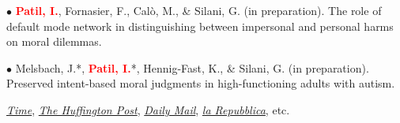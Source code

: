\documentclass[10pt]{article}
\begin{document}
	$\bullet$ \textbf{\textcolor{red}{Patil, I.}}, Fornasier, F., Cal\`{o}, M., \& Silani, G. (in preparation). The role of default mode network in \hspace*{0.1in}distinguishing between impersonal and personal harms on moral dilemmas.
	\miniskip
	
	$\bullet$ Melsbach, J.*, \textbf{\textcolor{red}{Patil, I.}}*, Hennig-Fast, K., \& Silani, G. (in preparation). Preserved intent-based moral \hspace*{0.1in}judgments in high-functioning adults with autism.
	
%	
%	
%	
	
	\href{http://time.com/3242/driving-over-your-best-friend-its-the-right-thing-to-do/}{\textit{Time}}, \href{http://www.huffingtonpost.com/entry/autism-empathy-brain-research_us_56f92575e4b014d3fe237413}{\textit{The Huffington Post}}, \href{http://www.dailymail.co.uk/sciencetech/article-4308284/Virtual-reality-experiment-puts-altruism-test.html}{\textit{Daily Mail}}, \href{http://www.repubblica.it/scienze/2017/04/11/news/area_cervello_perdono-162669836/?rss}{\textit{la Repubblica}}, etc.
	
	
\end{document}
